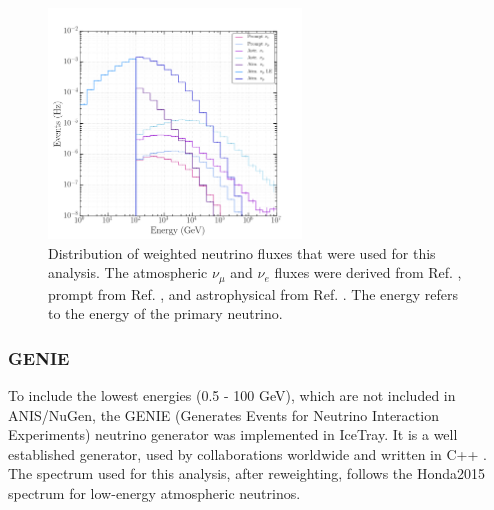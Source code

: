\begin{figure}
\centering
\includegraphics[width=0.6\textwidth]{chapter6/img/neutrinoenergy.png}
\caption{Distribution of weighted neutrino fluxes that were used for this analysis. The atmospheric $\nu_\mu$ and $\nu_e$ fluxes were derived from Ref. \cite{Honda:2006qj}, prompt from Ref. \cite{Enberg:2008te}, and astrophysical from Ref. \cite{Aartsen:2014gkd}. The energy refers to the energy of the primary neutrino.}
\label{fig:neutrinospectrum}
\end{figure}

\subsubsection{GENIE}
To include the lowest energies (0.5 - 100 GeV), which are not included in ANIS/NuGen, the GENIE (Generates Events for Neutrino Interaction Experiments) neutrino generator was implemented in IceTray. It is a well established generator, used by collaborations worldwide and written in C++ \cite{Andreopoulos:2009rq,Andreopoulos:2015wxa}.\\

\noindent The spectrum used for this analysis, after reweighting, follows the Honda2015 spectrum \cite{Honda:2015fha} for low-energy atmospheric neutrinos.

